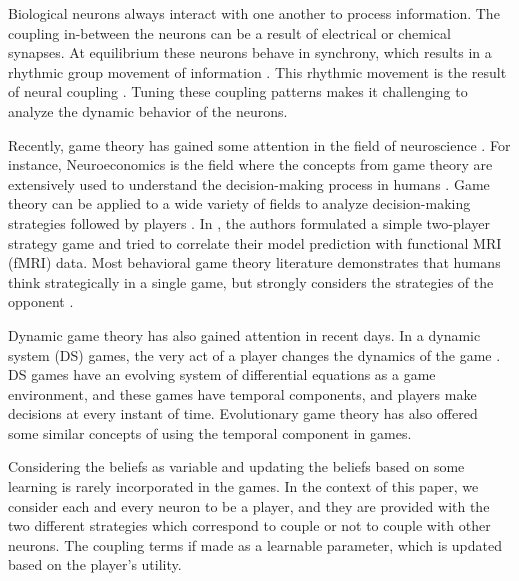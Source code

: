 \documentclass{article}
\begin{document}
Biological neurons always interact with one another to process information. The coupling in-between the neurons can be a result of electrical or chemical synapses. At equilibrium these neurons behave in synchrony, which results in a rhythmic group movement of information \cite{varela2001brainweb, golomb1994clustering}. This rhythmic movement is the result of neural coupling \cite{varela2001brainweb}. Tuning these coupling patterns makes it challenging to analyze the dynamic behavior of the neurons.

Recently, game theory has gained some attention in the field of neuroscience \cite{schuster2010application}. For instance, Neuroeconomics is the field where the concepts from game theory are extensively used to understand the decision-making process in humans \cite{loewenstein2008neuroeconomics}. Game theory can be applied to a wide variety of fields to analyze decision-making strategies followed by players \cite{srivastava2005using}. In \cite{hampton2008neural}, the authors formulated a simple two-player strategy game and tried to correlate their model prediction with functional MRI (fMRI) data. Most behavioral game theory literature demonstrates that humans think strategically in a single game, but strongly considers the strategies of the opponent \cite{costa2001cognition}. 

Dynamic game theory has also gained attention in recent days. In a dynamic system (DS) games, the very act of a player changes the dynamics of the game \cite{akiyama2000dynamical}. DS games have an evolving system of differential equations as a game environment, and these games have temporal components, and players make decisions at every instant of time. Evolutionary game theory \cite{dawkins1983john} has also offered some similar concepts of using the temporal component in games.

Considering the beliefs as variable and updating the beliefs based on some learning is rarely incorporated in the games. In the context of this paper, we consider each and every neuron to be a player, and they are provided with the two different strategies which correspond to couple or not to couple with other neurons. The coupling terms if made as a learnable parameter, which is updated based on the player's utility.
\end{document}
